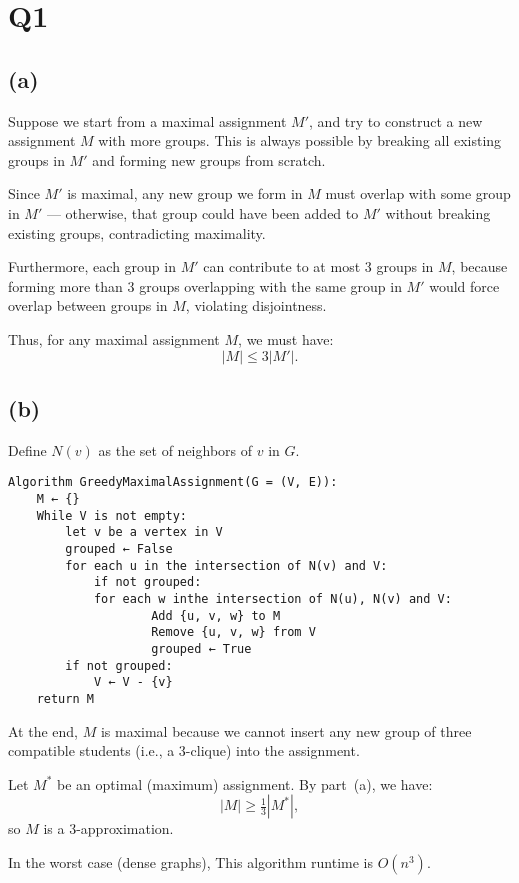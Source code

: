 \section*{Q1}


\subsection*{(a)}

Suppose we start from a maximal assignment $M'$, and try to construct a new assignment $M$ with more groups. This is always possible by breaking all existing groups in $M'$ and forming new groups from scratch.

Since $M'$ is maximal, any new group we form in $M$ must overlap with some group in $M'$ — otherwise, that group could have been added to $M'$ without breaking existing groups, contradicting maximality.

Furthermore, each group in $M'$ can contribute to at most 3 groups in $M$, because forming more than 3 groups overlapping with the same group in $M'$ would force overlap between groups in $M$, violating disjointness.

Thus, for any maximal assignment $M$, we must have:
\[
|M| \leq 3|M'|.
\]

\subsection*{(b)}

Define $N(v)$ as the set of neighbors of $v$ in $G$.

\begin{verbatim}
Algorithm GreedyMaximalAssignment(G = (V, E)):
    M ← {}
    While V is not empty:
        let v be a vertex in V
        grouped ← False
        for each u in the intersection of N(v) and V:
            if not grouped:
            for each w inthe intersection of N(u), N(v) and V:
                    Add {u, v, w} to M
                    Remove {u, v, w} from V
                    grouped ← True
        if not grouped:
            V ← V - {v}
    return M
\end{verbatim}

At the end, $M$ is maximal because we cannot insert any new group of three compatible students (i.e., a 3-clique) into the assignment.

Let $M^*$ be an optimal (maximum) assignment. By part~(a), we have:
\[
|M| \ge \tfrac{1}{3} |M^*|,
\]
so $M$ is a 3-approximation.

In the worst case (dense graphs), This algorithm runtime is $O(n^3)$.